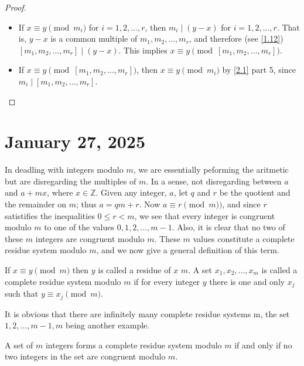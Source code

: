 \documentclass[11pt]{article}
\begin{document}
\begin{proof}
    \begin{itemize}
        \item If \(x \equiv y \pmod{m_i}\) for \(i = 1, 2, \ldots, r\), then \(m_i \mid (y -
              x)\) for \(i = 1, 2, \ldots, r\). That is, \(y - x\) is a common multiple of
              \(m_1, m_2, \ldots, m_r\), and therefore (see \cref{1.12}) \([m_1, m_2,
                      \ldots, m_r] \mid (y - x)\). This implies \(x \equiv y \pmod{[m_1, m_2, \ldots,
                          m_r]}\).
        \item If \(x \equiv y \pmod{[m_1, m_2, \ldots, m_r]}\), then \(x \equiv y
              \pmod{m_i}\) by \cref{2.1} part 5, since \(m_i \mid [m_1, m_2, \ldots,
                  m_r]\).
    \end{itemize}
\end{proof}
\section{January 27, 2025}
In deadling with integers modulo \(m\), we are essentially peforming the
aritmetic but are disregarding the multiples of \(m\). In a sense, not
disregarding between \(a\) and \(a + mx\), where \(x \in \mathbb{Z}\). Given
any integer, \(a\), let \(q\) and \(r\) be the quotient and the remainder on
\(m\); thus \(a = qm + r\). Now \(a \equiv r \pmod{m})\), and since \(r\)
satistifies the inequalities \(0 \leqslant r < m\), we see that every integer
is congruent modulo \(m\) to one of the values \(0, 1, 2, \ldots, m - 1\).
Also, it is clear that no two of these \(m\) integers are congruent modulo
\(m\). These \(m\) values constitute a complete residue system modulo \(m\),
and we now give a general definition of this term.

\begin{definition}
    If \(x \equiv y \pmod {m}\) then \(y\) is called a residue of \(x\)  \(m\). A set \(x_1, x_2, \ldots, x_m\) is called a complete residue system modulo \(m\) if for every integer \(y\) there is one and only \(x_j\) such that \(y \equiv x_j\pmod {m}\).
\end{definition}

It is obvious that there are infinitely many complete residue systems
 m, the set \(1, 2, \ldots, m - 1, m\) being another example.

A set of \(m\) integers forms a complete residue system modulo \(m\) if and
only if no two integers in the set are congruent modulo \(m\).
\end{document}
